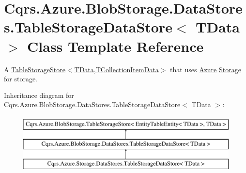 \hypertarget{classCqrs_1_1Azure_1_1BlobStorage_1_1DataStores_1_1TableStorageDataStore}{}\section{Cqrs.\+Azure.\+Blob\+Storage.\+Data\+Stores.\+Table\+Storage\+Data\+Store$<$ T\+Data $>$ Class Template Reference}
\label{classCqrs_1_1Azure_1_1BlobStorage_1_1DataStores_1_1TableStorageDataStore}


A \hyperlink{classCqrs_1_1Azure_1_1BlobStorage_1_1TableStorageStore_aabc36bc46ffb22b716cc7769a641cfab_aabc36bc46ffb22b716cc7769a641cfab}{Table\+Storage\+Store$<$\+T\+Data,\+T\+Collection\+Item\+Data$>$} that uses \hyperlink{namespaceCqrs_1_1Azure}{Azure} \hyperlink{namespaceCqrs_1_1Azure_1_1Storage}{Storage} for storage.  


Inheritance diagram for Cqrs.\+Azure.\+Blob\+Storage.\+Data\+Stores.\+Table\+Storage\+Data\+Store$<$ T\+Data $>$\+:\begin{figure}[H]
\begin{center}
\leavevmode
\includegraphics[height=3.000000cm]{classCqrs_1_1Azure_1_1BlobStorage_1_1DataStores_1_1TableStorageDataStore}
\end{center}
\end{figure}
